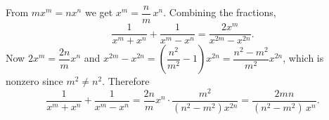 From $mx^m=nx^n$ we get $x^m=\dfrac {n}{m}\,x^n$. Combining the fractions,
\[
\dfrac{1}{x^m+x^n}+\dfrac{1}{x^m-x^n}=\dfrac{2x^m}{x^{2m}-x^{2n}} .
\]
Now $2x^m=\dfrac{2n}{m}x^n$ and $x^{2m}-x^{2n}=\left(\dfrac{n^2}{m^2}-1\right)x^{2n}=\dfrac{n^2-m^2}{m^2}x^{2n}$, which is nonzero since $m^2\ne n^2$. Therefore
\[
\dfrac{1}{x^m+x^n}+\dfrac{1}{x^m-x^n}=\dfrac{2n}{m}x^n\cdot\dfrac{m^2}{(n^2-m^2)x^{2n}}=\boxed{\dfrac{2mn}{(n^2-m^2)\,x^n}}.
\]
